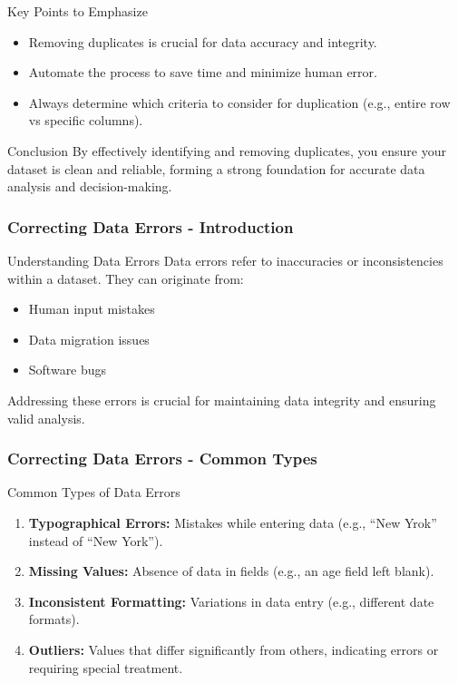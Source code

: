 \documentclass[aspectratio=169]{beamer}
\begin{document}
\begin{frame}{Key Points to Emphasize}
  \begin{itemize}
    \item Removing duplicates is crucial for data accuracy and integrity.
    \item Automate the process to save time and minimize human error.
    \item Always determine which criteria to consider for duplication (e.g., entire row vs specific columns).
  \end{itemize}
\end{frame}

\begin{frame}[fragile]{Conclusion}
  By effectively identifying and removing duplicates, you ensure your dataset is clean and reliable, forming a strong foundation for accurate data analysis and decision-making.
\end{frame}

\begin{frame}[fragile]
    \frametitle{Correcting Data Errors - Introduction}
    \begin{block}{Understanding Data Errors}
        Data errors refer to inaccuracies or inconsistencies within a dataset. They can originate from:
        \begin{itemize}
            \item Human input mistakes
            \item Data migration issues
            \item Software bugs
        \end{itemize}
        Addressing these errors is crucial for maintaining data integrity and ensuring valid analysis.
    \end{block}
\end{frame}

\begin{frame}[fragile]
    \frametitle{Correcting Data Errors - Common Types}
    \begin{block}{Common Types of Data Errors}
        \begin{enumerate}
            \item \textbf{Typographical Errors:} Mistakes while entering data (e.g., ``New Yrok'' instead of ``New York'').
            \item \textbf{Missing Values:} Absence of data in fields (e.g., an age field left blank).
            \item \textbf{Inconsistent Formatting:} Variations in data entry (e.g., different date formats).
            \item \textbf{Outliers:} Values that differ significantly from others, indicating errors or requiring special treatment.
        \end{enumerate}
    \end{block}
\end{frame}
\end{document}
